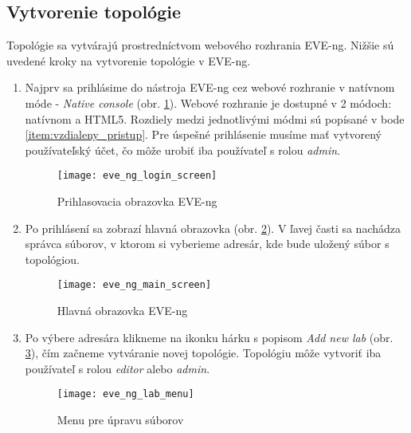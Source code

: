 \subsection{Vytvorenie topológie}
\label{chap:vytvorenie_topo_eve-ng}
Topológie sa vytvárajú prostredníctvom webového rozhrania EVE-ng. Nižšie sú uvedené kroky na vytvorenie topológie v EVE-ng.

\begin{enumerate}[noitemsep]

    \item \label{item:prihlasenie} Najprv sa prihlásime do nástroja EVE-ng cez webové rozhranie v natívnom móde - \emph{Native console} (obr. \ref{obr:eve_ng_login_screen}). Webové rozhranie je dostupné v 2 módoch: natívnom a HTML5. Rozdiely medzi jednotlivými módmi sú popísané v bode \ref{item:vzdialeny_pristup}. Pre úspešné prihlásenie musíme mať vytvorený používateľský účet, čo môže urobiť iba používateľ s rolou \emph{admin}.

\begin{figure}
    \centering
    \texttt{[image: eve\_ng\_login\_screen]}
    \caption{Prihlasovacia obrazovka EVE-ng}
    \label{obr:eve_ng_login_screen}
\end{figure}

    \item Po prihlásení sa zobrazí hlavná obrazovka (obr. \ref{obr:eve_ng_main_screen}). V ľavej časti sa nachádza správca súborov, v ktorom si vyberieme adresár, kde bude uložený súbor s topológiou.

\begin{figure}
    \centering
    \texttt{[image: eve\_ng\_main\_screen]}
    \caption{Hlavná obrazovka EVE-ng}
    \label{obr:eve_ng_main_screen}
\end{figure}

    \item Po výbere adresára klikneme na ikonku hárku s popisom \emph{Add new lab} (obr. \ref{obr:eve_ng_lab_menu}), čím začneme vytváranie novej topológie. Topológiu môže vytvoriť iba používateľ s rolou \emph{editor} alebo \emph{admin}.

\begin{figure}
    \centering
        \texttt{[image: eve\_ng\_lab\_menu]}
    \caption{Menu pre úpravu súborov}
    \label{obr:eve_ng_lab_menu}
\end{figure}


\end{enumerate}
